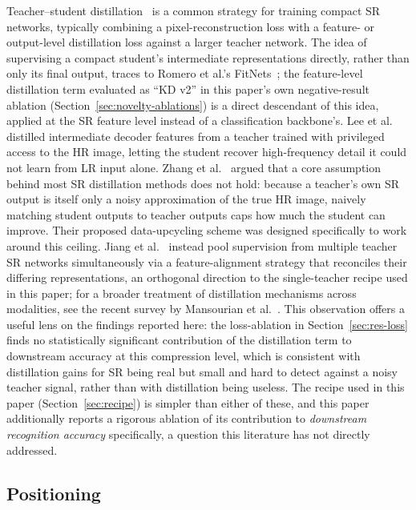 \documentclass[pdflatex,sn-vancouver-num]{sn-jnl}
\begin{document}
Teacher--student distillation~\cite{hinton2015distilling} is a common strategy for training compact SR networks, typically combining a pixel-reconstruction loss with a feature- or output-level distillation loss against a larger teacher network. The idea of supervising a compact student's intermediate representations directly, rather than only its final output, traces to Romero et al.'s FitNets~\cite{romero2015fitnets}; the feature-level distillation term evaluated as ``KD v2'' in this paper's own negative-result ablation (Section~\ref{sec:novelty-ablations}) is a direct descendant of this idea, applied at the SR feature level instead of a classification backbone's. Lee et al.~\cite{lee2020privileged} distilled intermediate decoder features from a teacher trained with privileged access to the HR image, letting the student recover high-frequency detail it could not learn from LR input alone. Zhang et al.~\cite{zhang2024dukd} argued that a core assumption behind most SR distillation methods does not hold: because a teacher's own SR output is itself only a noisy approximation of the true HR image, naively matching student outputs to teacher outputs caps how much the student can improve. Their proposed data-upcycling scheme was designed specifically to work around this ceiling. Jiang et al.~\cite{jiang2024mtkd} instead pool supervision from multiple teacher SR networks simultaneously via a feature-alignment strategy that reconciles their differing representations, an orthogonal direction to the single-teacher recipe used in this paper; for a broader treatment of distillation mechanisms across modalities, see the recent survey by Mansourian et al.~\cite{mansourian2025kdsurvey}. This observation offers a useful lens on the findings reported here: the loss-ablation in Section~\ref{sec:res-loss} finds no statistically significant contribution of the distillation term to downstream accuracy at this compression level, which is consistent with distillation gains for SR being real but small and hard to detect against a noisy teacher signal, rather than with distillation being useless. The recipe used in this paper (Section~\ref{sec:recipe}) is simpler than either of these, and this paper additionally reports a rigorous ablation of its contribution to \emph{downstream recognition accuracy} specifically, a question this literature has not directly addressed.

\subsection{Positioning}
\end{document}
